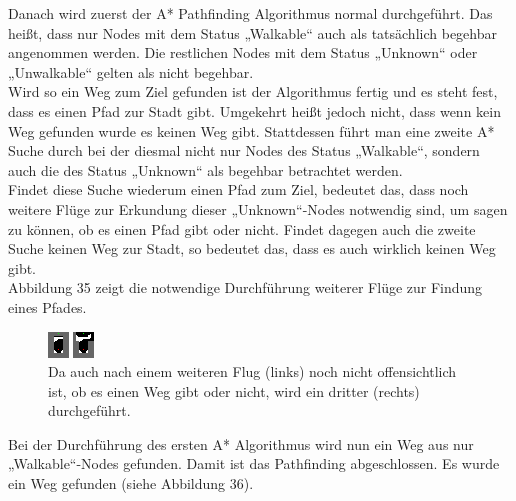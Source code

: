 \documentclass[a4paper,12pt]{article}
\begin{document}
Danach wird zuerst der A* Pathfinding Algorithmus normal durchgeführt. Das heißt, dass nur Nodes mit dem Status „Walkable“ auch als tatsächlich begehbar angenommen werden. Die restlichen Nodes mit dem Status „Unknown“ oder „Unwalkable“ gelten als nicht begehbar.
\\[0.4cm]
Wird so ein Weg zum Ziel gefunden ist der Algorithmus fertig und es steht fest, dass es einen Pfad zur Stadt gibt. Umgekehrt heißt jedoch nicht, dass wenn kein Weg gefunden wurde es keinen Weg gibt. Stattdessen führt man eine zweite A* Suche durch bei der diesmal nicht nur Nodes des Status „Walkable“, sondern auch die des Status „Unknown“ als begehbar betrachtet werden.
\\[0.4cm]
Findet diese Suche wiederum einen Pfad zum Ziel, bedeutet das, dass noch weitere Flüge zur Erkundung dieser „Unknown“-Nodes notwendig sind, um sagen zu können, ob es einen Pfad gibt oder nicht.
Findet dagegen auch die zweite Suche keinen Weg zur Stadt, so bedeutet das, dass es auch wirklich keinen Weg gibt.
\\[0.4cm]
Abbildung 35 zeigt die notwendige Durchführung weiterer Flüge zur Findung eines Pfades.
\begin{figure}[H]
\centering
    \includegraphics[width=1\linewidth]{Bilder/Aufgabe3/Teilaufgabe_A/Beispiel_03.png}
    \caption{Da auch nach einem weiteren Flug (links) noch nicht offensichtlich ist, ob es einen Weg gibt oder nicht, wird ein dritter (rechts) durchgeführt.}
\end{figure}
Bei der Durchführung des ersten A* Algorithmus wird nun ein Weg aus nur „Walkable“-Nodes gefunden. Damit ist das Pathfinding abgeschlossen. Es wurde ein Weg gefunden (siehe Abbildung 36).
\end{document}
